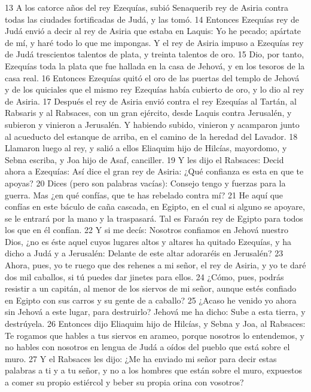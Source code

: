  
13 A los catorce años del rey Ezequías, subió Senaquerib rey de Asiria contra todas las ciudades fortificadas de Judá, y las tomó.
14 Entonces Ezequías rey de Judá envió a decir al rey de Asiria que estaba en Laquis: Yo he pecado; apártate de mí, y haré todo lo que me impongas. Y el rey de Asiria impuso a Ezequías rey de Judá trescientos talentos de plata,  y treinta talentos de oro.
15 Dio, por tanto, Ezequías toda la plata que fue hallada en la casa de Jehová, y en los tesoros de la casa real.
16 Entonces Ezequías quitó el oro de las puertas del templo de Jehová y de los quiciales que el mismo rey Ezequías había cubierto de oro, y lo dio al rey de Asiria.
17 Después el rey de Asiria envió contra el rey Ezequías al Tartán, al Rabsaris y al Rabsaces, con un gran ejército, desde Laquis contra Jerusalén, y subieron y vinieron a Jerusalén. Y habiendo subido, vinieron y acamparon junto al acueducto del estanque de arriba, en el camino de la heredad del Lavador.
18 Llamaron luego al rey, y salió a ellos Eliaquim hijo de Hilcías, mayordomo, y Sebna escriba, y Joa hijo de Asaf, canciller.
19 Y les dijo el Rabsaces: Decid ahora a Ezequías: Así dice el gran rey de Asiria: ¿Qué confianza es esta en que te apoyas?
20 Dices (pero son palabras vacías): Consejo tengo y fuerzas para la guerra. Mas ¿en qué confías, que te has rebelado contra mí?
21 He aquí que confías en este báculo de caña cascada, en Egipto, en el cual si alguno se apoyare, se le entrará por la mano y la traspasará. Tal es Faraón rey de Egipto para todos los que en él confían.
22 Y si me decís: Nosotros confiamos en Jehová nuestro Dios, ¿no es éste aquel cuyos lugares altos y altares ha quitado Ezequías, y ha dicho a Judá y a Jerusalén: Delante de este altar adoraréis en Jerusalén?
23 Ahora, pues, yo te ruego que des rehenes a mi señor, el rey de Asiria, y yo te daré dos mil caballos, si tú puedes dar jinetes para ellos.
24 ¿Cómo, pues, podrás resistir a un capitán, al menor de los siervos de mi señor, aunque estés confiado en Egipto con sus carros y su gente de a caballo?
25 ¿Acaso he venido yo ahora sin Jehová a este lugar, para destruirlo? Jehová me ha dicho: Sube a esta tierra, y destrúyela.
26 Entonces dijo Eliaquim hijo de Hilcías, y Sebna y Joa, al Rabsaces: Te rogamos que hables a tus siervos en arameo, porque nosotros lo entendemos, y no hables con nosotros en lengua de Judá a oídos del pueblo que está sobre el muro.
27 Y el Rabsaces les dijo: ¿Me ha enviado mi señor para decir estas palabras a ti y a tu señor, y no a los hombres que están sobre el muro, expuestos a comer su propio estiércol y beber su propia orina con vosotros?
